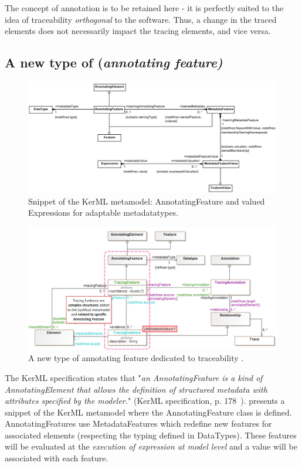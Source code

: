The concept of annotation is to be retained here - it is perfectly suited to the idea of traceability \textit{orthogonal} to the software. Thus, a change in the traced elements does not necessarily impact the tracing elements, and vice versa.



\subsection{A new type of (\textit{annotating feature)}}
\begin{figure}[h]     
	\centering
	\includegraphics[width=.99\linewidth]{images/kerml-annotatingfeature.jpg}
	\caption{Snippet of the KerML metamodel: AnnotatingFeature and valued Expressions for adaptable metadatatypes.}
	\label{fig:kermlannot}
\end{figure}

\begin{figure}[h]     
	\centering
	\includegraphics[width=.99\linewidth]{images/strategy3-annotatingfeature.jpg}
	\caption{A new type of annotating feature dedicated to traceability .}
	\label{fig:strategy3}
\end{figure}

The KerML specification states that "\textit{an AnnotatingFeature is a kind of AnnotatingElement that allows the definition of structured metadata with attributes specified by the modeler.}" (KerML specification, p. 178~\cite{kerML}).  presents a snippet of the KerML metamodel where the AnnotatingFeature class is defined. AnnotatingFeatures use MetadataFeatures which redefine new features for associated elements (respecting the typing defined in DataTypes). These features will be evaluated at the \textit{execution of expression at model level} and a value will be associated with each feature.


